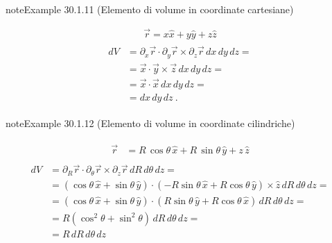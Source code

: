 \documentclass[letterpaper,10pt,italian]{jupyterBook}
\begin{document}
\label{ch/vector-calculus/geometry:volume-cartesian-coords}
\begin{sphinxadmonition}{note}{Example 30.1.11 (Elemento di volume in coordinate cartesiane)}


\begin{equation*}
\begin{split}\vec{r} = x \hat{x} + y \hat{y} + z \hat{z}\end{split}
\end{equation*}\begin{equation*}
\begin{split}\begin{aligned}
  d V
  & = \partial_x \vec{r} \cdot \partial_y \vec{r} \times \partial_z \vec{r} \, dx \, dy \, dz = \\
  & = \vec{x} \cdot \vec{y} \times \vec{z} \, dx \, dy \, dz = \\
  & = \vec{x} \cdot \vec{x} \, dx \, dy \, dz = \\
  & = dx \, dy \, dz \ .
\end{aligned}\end{split}
\end{equation*}\end{sphinxadmonition}
\label{ch/vector-calculus/geometry:volume-cylindrical-coords}
\begin{sphinxadmonition}{note}{Example 30.1.12 (Elemento di volume in coordinate cilindriche)}


\begin{equation*}
\begin{split}\begin{aligned}
  \vec{r}
  & = R \, \cos \theta \, \hat{x} + R \, \sin \theta \, \hat{y} + z \, \hat{z} 
\end{aligned}\end{split}
\end{equation*}\begin{equation*}
\begin{split}\begin{aligned}
  d V
  & = \partial_R \vec{r} \cdot \partial_{\theta} \vec{r} \times \partial_{z} \vec{r} \, dR \, d\theta \, d z = \\
  & = (\cos \theta \, \hat{x} + \sin \theta \, \hat{y}) \cdot (-R \sin \theta \, \hat{x} + R \cos \theta \, \hat{y}) \times \hat{z}  \, dR \, d\theta \, d z = \\
  & = (\cos \theta \, \hat{x} + \sin \theta \, \hat{y}) \cdot ( R \sin \theta \, \hat{y} + R \cos \theta \, \hat{x}) \, dR \, d\theta \, d z = \\
  & = R (\cos^2 \theta + \sin^2 \theta) \, dR \, d\theta \, d z = \\
  & = R \, dR \, d \theta \, dz 
\end{aligned}\end{split}
\end{equation*}\end{sphinxadmonition}
\end{document}
